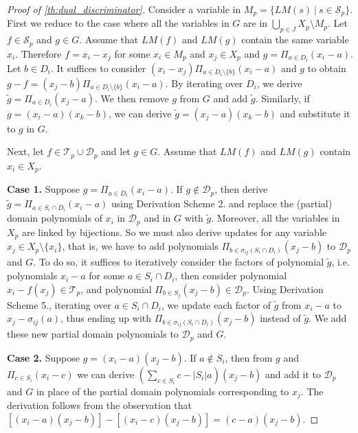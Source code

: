 \documentclass[11pt]{article}
\begin{document}
\begin{proof} [Proof of \cref{th:dual_discriminator}]

Consider a variable in $M_p = \{LM(s) \ | \ s \in \mathcal{S}_p\}$. First we reduce to the case where all the variables in $G$ are in $\bigcup_{p \in J} X_p \setminus M_p$. Let $f \in \mathcal{S}_p$ and $g \in G$. Assume that $LM(f)$ and $LM(g)$ contain the same variable $x_i$. Therefore $f = x_i - x_j$ for some $x_i \in M_p$ and $x_j \in X_p$ and $g = \Pi_{a \in D_i}(x_i - a)$. Let $b \in D_i$. It suffices to consider $(x_i - x_j)\Pi_{a \in D_i \setminus \{ b \}}(x_i - a)$ and $g$ to obtain $g - f = (x_j - b)\Pi_{a \in D_i \setminus \{ b \}}(x_i - a)$. By iterating over $D_i$, we derive $\tilde{g} = \Pi_{a \in D_i}(x_j - a)$. We then remove $g$ from $G$ and add $\tilde{g}$. Similarly, if $g = (x_i - a)(x_k - b)$, we can derive $\tilde{g} = (x_j - a)(x_k -b)$ and substitute it to $g$ in $G$.

Next, let $f \in \mathcal{T}_p \cup \mathcal{D}_p$ and let $g \in G$. Assume that $LM(f)$ and $LM(g)$ contain $x_i \in X_p$.

\textbf{Case 1.} Suppose $g = \Pi_{a \in D_i} (x_i - a)$. If $g \notin \mathcal{D}_p$, then derive $\tilde{g} = \Pi_{a \in S_i \cap D_i} (x_i - a)$ using Derivation Scheme 2. and replace the (partial) domain polynomials of $x_i$ in $\mathcal{D}_p$ and in $G$ with $\tilde{g}$. Moreover, all the variables in $X_p$ are linked by bijections. So we must also derive updates for any variable $x_j \in X_p \setminus \{x_i\}$, that is, we have to add polynomials $\Pi_{b \in \sigma_{ij}(S_i \cap D_i)}(x_j - b)$ to $\mathcal{D}_p$ and $G$. To do so, it suffices to iteratively consider the factors of polynomial $\tilde{g}$, i.e. polynomials $x_i - a$ for some $a \in S_i \cap D_i$, then consider polynomial $x_i - f(x_j) \in \mathcal{T}_p$, and polynomial $\Pi_{b \in S_j} (x_j - b) \in \mathcal{D}_p$. Using Derivation Scheme 5., iterating over $a \in S_i \cap D_i$, we update each factor of $\tilde{g}$ from $x_i - a$ to $x_j - \sigma_{ij}(a)$, thus ending up with $\Pi_{b \in \sigma_{ij}(S_i \cap D_i)}(x_j - b)$ instead of $\tilde{g}$. We add these new partial domain polynomials to $\mathcal{D}_p$ and $G$.

\textbf{Case 2.} Suppose $ g = (x_i - a)(x_j - b)$. If $a \notin S_i$, then from $g$ and $\Pi_{c \in S_i}(x_i - c)$ we can derive $(\sum_{c \in S_i} c - |S_i| a)(x_j - b)$ and add it to $\mathcal{D}_p$ and $G$ in place of the partial domain polynomials corresponding to $x_j$. The derivation follows from the observation that $[(x_i - a)(x_j - b)] - [(x_i - c)(x_j - b)] = (c - a)(x_j - b)$.


\end{proof}
\end{document}
